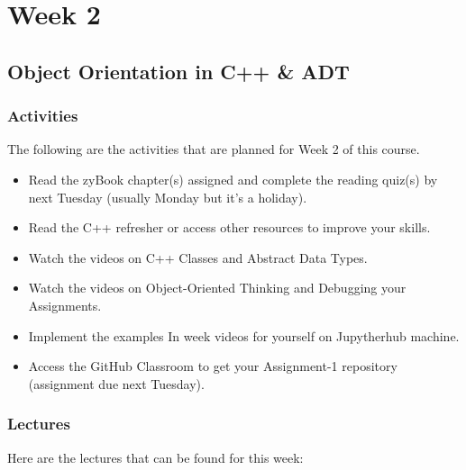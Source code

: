 \clearpage

\renewcommand{\ChapTitle}{Week 2}
\renewcommand{\SectionTitle}{Object Orientation in C++ \& ADT}

\chapter{\ChapTitle}

\section{\SectionTitle}

\subsection{Activities}

The following are the activities that are planned for Week 2 of this course.

\begin{itemize}
    \item Read the zyBook chapter(s) assigned and complete the reading quiz(s) by next Tuesday (usually Monday but it's a holiday).
    \item Read the C++ refresher or access other resources to improve your skills.
    \item Watch the videos on C++ Classes and Abstract Data Types.
    \item Watch the videos on Object-Oriented Thinking and Debugging your Assignments.
    \item Implement the examples In week videos for yourself on Jupytherhub machine.
    \item Access the GitHub Classroom to get your Assignment-1 repository  (assignment due next Tuesday).
\end{itemize}

\subsection{Lectures}

Here are the lectures that can be found for this week:

